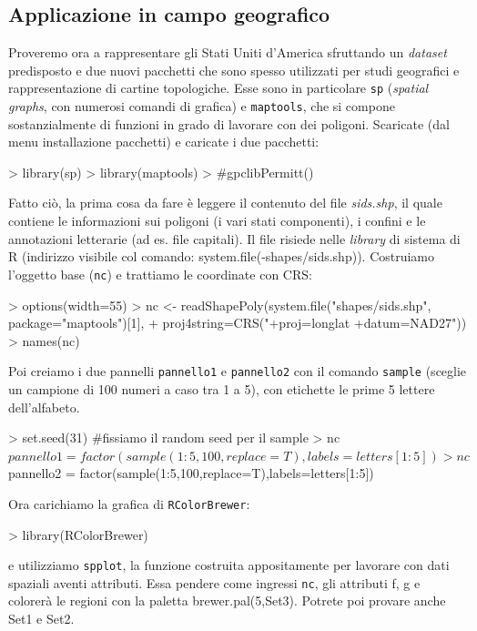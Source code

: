 \documentclass[onecolumn,11pt]{book}
\begin{document}
\subsection{Applicazione in campo geografico}
Proveremo ora a rappresentare gli Stati Uniti d'America sfruttando un \emph{dataset} predisposto e due nuovi pacchetti che sono spesso utilizzati per studi geografici e rappresentazione di cartine topologiche.  Esse sono in particolare \texttt{sp} ({\it spatial graphs}, con numerosi comandi di grafica) e \texttt{maptools}, che si compone sostanzialmente di funzioni in grado di lavorare con dei poligoni.
Scaricate (dal menu installazione pacchetti) e caricate i due pacchetti:
\begin{Schunk}
\begin{Sinput}
> library(sp)
> library(maptools)
> #gpclibPermitt()
\end{Sinput}
\end{Schunk}
Fatto ci\`o, la prima cosa da fare \`e leggere il contenuto del file {\it sids.shp}, il quale contiene le informazioni sui poligoni (i vari stati componenti),  i confini e le annotazioni letterarie (ad es. file capitali). Il file risiede nelle {\it library} di sistema di \textsf{R} (indirizzo visibile col comando: system.file(-shapes/sids.shp)).
Costruiamo l'oggetto base (\texttt{nc}) e trattiamo le coordinate con CRS:
\begin{Schunk}
\begin{Sinput}
> options(width=55)
> nc <- readShapePoly(system.file("shapes/sids.shp", package="maptools")[1],
+ proj4string=CRS("+proj=longlat +datum=NAD27"))
> names(nc)
\end{Sinput}
\end{Schunk}
 
Poi creiamo i due pannelli \texttt{pannello1} e \texttt{pannello2} con il comando \texttt{sample} (sceglie un campione di 100 numeri a caso tra 1 a 5), con etichette le prime 5 lettere dell'alfabeto.
\begin{Schunk}
\begin{Sinput}
> set.seed(31) #fissiamo il random seed per il sample
> nc$pannello1 = factor(sample(1:5,100,replace=T),labels=letters[1:5])
> nc$pannello2 = factor(sample(1:5,100,replace=T),labels=letters[1:5])
\end{Sinput}
\end{Schunk}
Ora carichiamo la grafica di \texttt{RColorBrewer}:

\begin{Schunk}
\begin{Sinput}
> library(RColorBrewer)
\end{Sinput}
\end{Schunk}
e utilizziamo \texttt{spplot}, la funzione costruita appositamente per lavorare con dati spaziali aventi
attributi. Essa pendere come ingressi \texttt{nc}, gli attributi f, g e colorer\`a le regioni con la paletta
brewer.pal(5,Set3). Potrete poi provare anche Set1 e Set2.
\end{document}

